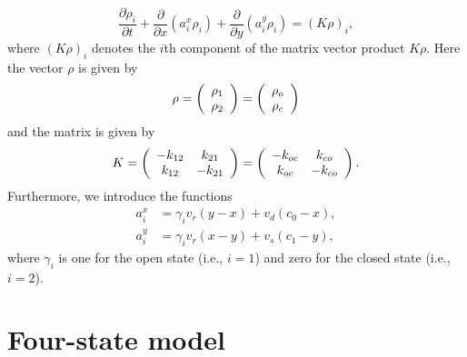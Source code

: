 \[
\frac{\partial\rho_{i}}{\partial t}+\frac{\partial}{\partial x}\left(
a_{i}^{x}\rho_{i}\right)  +\frac{\partial}{\partial y}\left(  a_{i}^{y}
\rho_{i}\right)  =\left(  K\rho\right)  _{i},
\]
where $\left(  K\rho\right)  _{i}$ denotes the $i$th component of the matrix
vector product $K\rho.$ Here the vector $\rho$ is given by
\[
\rho=\left(
\begin{array}
[c]{c}
\rho_{1}\\
\rho_{2}
\end{array}
\right)  =\left(
\begin{array}
[c]{c}
\rho_{o}\\
\rho_{c}
\end{array}
\right)  
\]
and the matrix is given by
\[
K=\left(
\begin{array}
[c]{cc}
-k_{12} & k_{21}\\
k_{12} & -k_{21}
\end{array}
\right) =\left(
\begin{array}
[c]{cc}
-k_{oc} & k_{co}\\
k_{oc} & -k_{co}
\end{array}
\right) .
\]
Furthermore, we introduce the functions
\begin{align*}
a_{i}^{x}  &  =\gamma_{i}v_{r}\left(  y-x\right)  +v_{d}\left(  c_{0}
-x\right)  ,\\
a_{i}^{y}  &  =\gamma_{i}v_{r}\left(  x-y\right)  +v_{s}\left(  c_{1}
-y\right)  ,
\end{align*}
where $\gamma_{i}$ is one for the open state (i.e., $i=1$) and zero for the closed
state (i.e., $i=2$).
\bigskip

\section{Four-state model}

